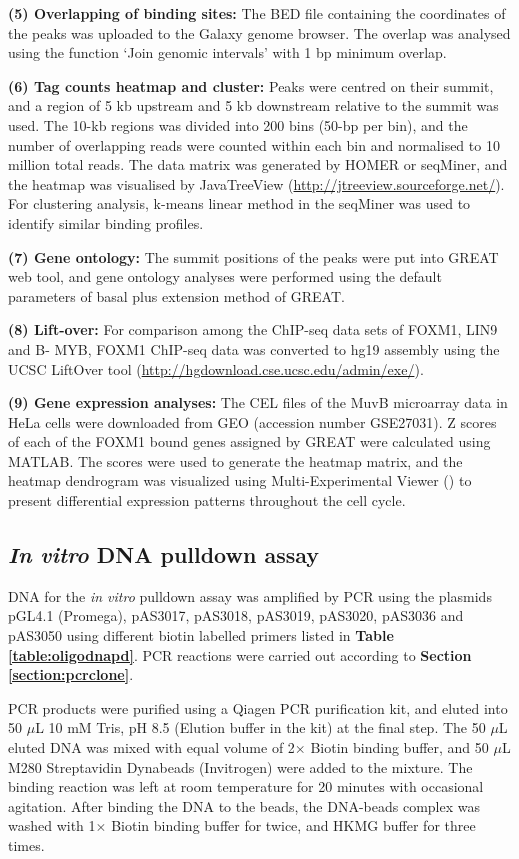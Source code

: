 \textbf{(5) Overlapping of binding sites:} The BED file containing the coordinates of the peaks was uploaded to the Galaxy genome browser. The overlap was analysed using the function `Join genomic intervals' with 1 bp minimum overlap.

\textbf{(6) Tag counts heatmap and cluster:} Peaks were centred on their summit, and a region of 5 kb upstream and 5 kb downstream relative to the summit was used. The 10-kb regions was divided into 200 bins (50-bp per bin), and the number of overlapping reads were counted within each bin and normalised to 10 million total reads. The data matrix was generated by HOMER or seqMiner, and the heatmap was visualised by JavaTreeView (\url{http://jtreeview.sourceforge.net/}). For clustering analysis, k-means linear method in the seqMiner was used to identify similar binding profiles.

\textbf{(7) Gene ontology:} The summit positions of the peaks were put into GREAT web tool, and gene ontology analyses were performed using the default parameters of basal plus extension method of GREAT.

\textbf{(8) Lift-over:} For comparison among the ChIP-seq data sets of FOXM1, LIN9 and B- MYB, FOXM1 ChIP-seq data was converted to hg19 assembly using the UCSC LiftOver tool (\url{http://hgdownload.cse.ucsc.edu/admin/exe/}).

\textbf{(9) Gene expression analyses:} The CEL files of the MuvB microarray data in HeLa cells were downloaded from GEO (accession number GSE27031). Z scores of each of the FOXM1 bound genes assigned by GREAT were calculated using MATLAB. The scores were used to generate the heatmap matrix, and the heatmap dendrogram was visualized using Multi-Experimental Viewer (\cite{saeed2003tm4:}) to present differential expression patterns throughout the cell cycle.

\subsection{\textit{In vitro} DNA pulldown assay}

DNA for the \textit{in vitro} pulldown assay was amplified by PCR using the plasmids pGL4.1 (Promega), pAS3017, pAS3018, pAS3019, pAS3020, pAS3036 and pAS3050 using different biotin labelled primers listed in \textbf{Table \ref{table:oligodnapd}}. PCR reactions were carried out according to \textbf{Section \ref{section:pcrclone}}.

PCR products were purified using a Qiagen PCR purification kit, and eluted into 50 $\mu$L 10 mM Tris, pH 8.5 (Elution buffer in the kit) at the final step. The 50 $\mu$L eluted DNA was mixed with equal volume of 2$\times$ Biotin binding buffer, and 50 $\mu$L M280 Streptavidin Dynabeads (Invitrogen) were added to the mixture. The binding reaction was left at room temperature for 20 minutes with occasional agitation. After binding the DNA to the beads, the DNA-beads complex was washed with 1$\times$ Biotin binding buffer for twice, and HKMG buffer for three times.


